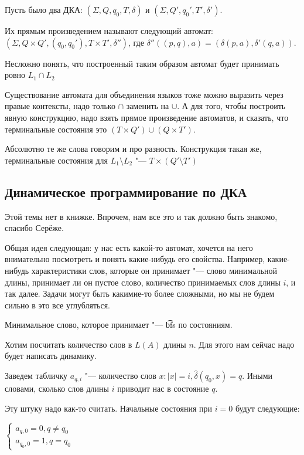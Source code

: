 \begin{Def}
Пусть было два ДКА: $(\Sigma, Q, q_0, T, \delta)$ и $(\Sigma, Q', q_0', T', \delta')$.

Их прямым произведением называют следующий автомат: $(\Sigma, Q \times Q', (q_0, q_0'), T \times T', \delta'')$, где $\delta''((p, q), a) = (\delta(p, a), \delta'(q, a))$.
\end{Def}
Несложно понять, что построенный таким образом автомат будет принимать ровно $L_1 \cap L_2$

Существование автомата для объединения языков тоже можно выразить через правые контексты, надо только $\cap$ заменить на $\cup$. 
А для того, чтобы построить явную конструкцию, надо взять прямое произведение автоматов, и сказать, что терминальные состояния это $(T \times Q') \cup (Q \times T')$.


Абсолютно те же слова говорим и про разность.
Конструкция такая же, терминальные состояния для $L_1 \setminus L_2$ "--- $T \times (Q' \setminus T')$


\subsection{Динамическое программирование по ДКА}
\begin{Rem}
Этой темы нет в книжке. Впрочем, нам все это и так должно быть знакомо, спасибо Серёже.
\end{Rem}

Общая идея следующая: у нас есть какой-то автомат, хочется на него внимательно посмотреть и понять какие-нибудь его свойства. 
Например, какие-нибудь характеристики слов, которые он принимает "--- слово минимальной длины, принимает ли он пустое слово, количество принимаемых слов длины $i$, и так далее.
Задачи могут быть какимие-то более сложными, но мы не будем сильно в это все углубляться.


Минимальное слово, которое принимает "--- \t{bfs} по состояниям.

Хотим посчитать количество слов в $L(A)$ длины $n$. Для этого нам сейчас надо будет написать динамику. 

Заведем табличку $a_{q, i}$ "--- количество слов $x: |x| = i, \hat \delta(q_0, x) = q$. 
Иными словами, сколько слов длины $i$ приводит нас в состояние $q$.

Эту штуку надо как-то считать. Начальные состояния при $i=0$ будут следующие:

$
    \begin{cases}
        a_{q, 0} = 0, q \neq q_0 \\
        a_{q_0, 0} = 1, q = q_0
    \end{cases} 
$

